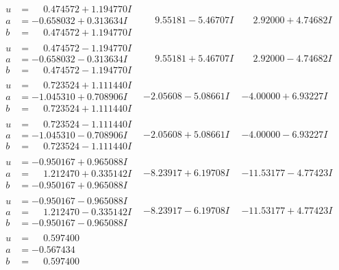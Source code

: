 \documentclass[1p]{elsarticle_modified}
\theoremstyle{definition}
\begin{document}
$$\begin{array}{c|c|c}
\begin{aligned}
u &= \phantom{-}0.474572 + 1.194770 I \\
a &= -0.658032 + 0.313634 I \\
b &= \phantom{-}0.474572 + 1.194770 I\end{aligned}
 & \phantom{-}9.55181 - 5.46707 I & \phantom{-}2.92000 + 4.74682 I \\ \hline\begin{aligned}
u &= \phantom{-}0.474572 - 1.194770 I \\
a &= -0.658032 - 0.313634 I \\
b &= \phantom{-}0.474572 - 1.194770 I\end{aligned}
 & \phantom{-}9.55181 + 5.46707 I & \phantom{-}2.92000 - 4.74682 I \\ \hline\begin{aligned}
u &= \phantom{-}0.723524 + 1.111440 I \\
a &= -1.045310 + 0.708906 I \\
b &= \phantom{-}0.723524 + 1.111440 I\end{aligned}
 & -2.05608 - 5.08661 I & -4.00000 + 6.93227 I \\ \hline\begin{aligned}
u &= \phantom{-}0.723524 - 1.111440 I \\
a &= -1.045310 - 0.708906 I \\
b &= \phantom{-}0.723524 - 1.111440 I\end{aligned}
 & -2.05608 + 5.08661 I & -4.00000 - 6.93227 I \\ \hline\begin{aligned}
u &= -0.950167 + 0.965088 I \\
a &= \phantom{-}1.212470 + 0.335142 I \\
b &= -0.950167 + 0.965088 I\end{aligned}
 & -8.23917 + 6.19708 I & -11.53177 - 4.77423 I \\ \hline\begin{aligned}
u &= -0.950167 - 0.965088 I \\
a &= \phantom{-}1.212470 - 0.335142 I \\
b &= -0.950167 - 0.965088 I\end{aligned}
 & -8.23917 - 6.19708 I & -11.53177 + 4.77423 I \\ \hline\begin{aligned}
u &= \phantom{-}0.597400\phantom{ +0.000000I} \\
a &= -0.567434\phantom{ +0.000000I} \\
b &= \phantom{-}0.597400\phantom{ +0.000000I}\end{aligned}

\end{array}$$
\end{document}
